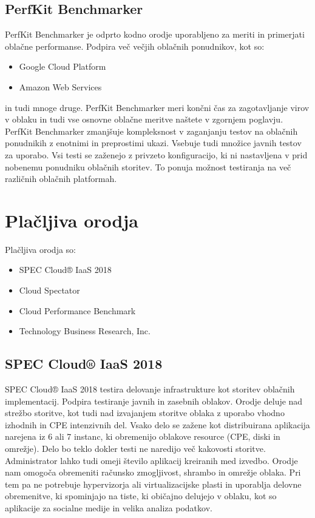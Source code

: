 \subsection{PerfKit Benchmarker}
PerfKit Benchmarker je odprto kodno orodje uporabljeno za meriti in primerjati oblačne performanse.
Podpira več večjih oblačnih ponudnikov, kot so:
\begin{itemize}
\item Google Cloud Platform
\item Amazon Web Services
\end{itemize}
in tudi mnoge druge. PerfKit Benchmarker meri končni čas za zagotavljanje virov v oblaku in tudi vse osnovne oblačne meritve naštete v zgornjem poglavju. PerfKit Benchmarker zmanjšuje kompleksnost v zaganjanju testov na oblačnih ponudnikih z enotnimi in preprostimi ukazi.
Vsebuje tudi množice javnih testov za uporabo. Vsi testi se zaženejo z privzeto konfiguracijo, ki ni nastavljena v prid nobenemu ponudniku oblačnih storitev. To ponuja možnost testiranja na več različnih oblačnih platformah.

\section{Plačljiva orodja}
Plačljiva orodja so:
\begin{itemize}
\item SPEC Cloud® IaaS 2018
\item Cloud Spectator
\item Cloud Performance Benchmark
\item Technology Business Research, Inc.
\end{itemize}

\subsection{SPEC Cloud® IaaS 2018}

SPEC Cloud® IaaS 2018 testira delovanje infrastrukture kot storitev oblačnih implementacij. Podpira testiranje javnih in zasebnih oblakov. Orodje deluje nad strežbo storitve, kot tudi nad izvajanjem storitve oblaka z uporabo vhodno izhodnih in CPE intenzivnih del. Vsako delo se zažene kot distribuirana aplikacija narejena iz 6 ali 7 instanc, ki obremenijo oblakove resource (CPE, diski in omrežje). Delo bo teklo dokler testi ne naredijo več kakovosti storitve. Administrator lahko tudi omeji število aplikacij kreiranih med izvedbo.
Orodje nam omogoča obremeniti računsko zmogljivost, shrambo in omrežje oblaka. Pri tem pa ne potrebuje hypervizorja ali virtualizacijske plasti in uporablja delovne obremenitve, ki spominjajo na tiste, ki običajno delujejo v oblaku, kot so aplikacije za socialne medije in velika analiza podatkov.

